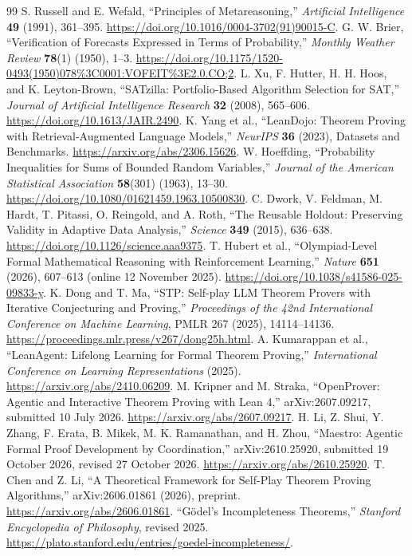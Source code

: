 \documentclass[11pt,letterpaper]{article}
\theoremstyle{definition}
\theoremstyle{plain}
\theoremstyle{definition}
\begin{document}
\begin{thebibliography}{99}
 S. Russell and E. Wefald, ``Principles of Metareasoning,'' \emph{Artificial Intelligence} \textbf{49} (1991), 361--395. \url{https://doi.org/10.1016/0004-3702(91)90015-C}.
 G. W. Brier, ``Verification of Forecasts Expressed in Terms of Probability,'' \emph{Monthly Weather Review} \textbf{78}(1) (1950), 1--3. \url{https://doi.org/10.1175/1520-0493(1950)078%3C0001:VOFEIT%3E2.0.CO;2}.
 L. Xu, F. Hutter, H. H. Hoos, and K. Leyton-Brown, ``SATzilla: Portfolio-Based Algorithm Selection for SAT,'' \emph{Journal of Artificial Intelligence Research} \textbf{32} (2008), 565--606. \url{https://doi.org/10.1613/JAIR.2490}.
 K. Yang et al., ``LeanDojo: Theorem Proving with Retrieval-Augmented Language Models,'' \emph{NeurIPS} \textbf{36} (2023), Datasets and Benchmarks. \url{https://arxiv.org/abs/2306.15626}.
 W. Hoeffding, ``Probability Inequalities for Sums of Bounded Random Variables,'' \emph{Journal of the American Statistical Association} \textbf{58}(301) (1963), 13--30. \url{https://doi.org/10.1080/01621459.1963.10500830}.
 C. Dwork, V. Feldman, M. Hardt, T. Pitassi, O. Reingold, and A. Roth, ``The Reusable Holdout: Preserving Validity in Adaptive Data Analysis,'' \emph{Science} \textbf{349} (2015), 636--638. \url{https://doi.org/10.1126/science.aaa9375}.
 T. Hubert et al., ``Olympiad-Level Formal Mathematical Reasoning with Reinforcement Learning,'' \emph{Nature} \textbf{651} (2026), 607--613 (online 12 November 2025). \url{https://doi.org/10.1038/s41586-025-09833-y}.
 K. Dong and T. Ma, ``STP: Self-play LLM Theorem Provers with Iterative Conjecturing and Proving,'' \emph{Proceedings of the 42nd International Conference on Machine Learning}, PMLR 267 (2025), 14114--14136. \url{https://proceedings.mlr.press/v267/dong25h.html}.
 A. Kumarappan et al., ``LeanAgent: Lifelong Learning for Formal Theorem Proving,'' \emph{International Conference on Learning Representations} (2025). \url{https://arxiv.org/abs/2410.06209}.
 M. Kripner and M. Straka, ``OpenProver: Agentic and Interactive Theorem Proving with Lean 4,'' arXiv:2607.09217, submitted 10 July 2026. \url{https://arxiv.org/abs/2607.09217}.
 H. Li, Z. Shui, Y. Zhang, F. Erata, B. Mikek, M. K. Ramanathan, and H. Zhou, ``Maestro: Agentic Formal Proof Development by Coordination,'' arXiv:2610.25920, submitted 19 October 2026, revised 27 October 2026. \url{https://arxiv.org/abs/2610.25920}.
 T. Chen and Z. Li, ``A Theoretical Framework for Self-Play Theorem Proving Algorithms,'' arXiv:2606.01861 (2026), preprint. \url{https://arxiv.org/abs/2606.01861}.
 ``G\"odel's Incompleteness Theorems,'' \emph{Stanford Encyclopedia of Philosophy}, revised 2025. \url{https://plato.stanford.edu/entries/goedel-incompleteness/}.
\end{thebibliography}
\end{document}
